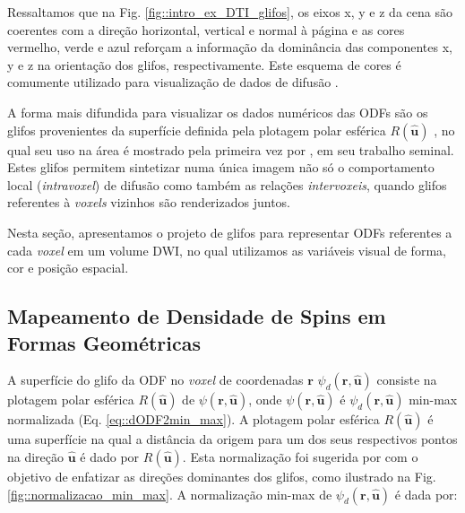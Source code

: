 \documentclass[
    12pt,                %
    oneside,            %
    a4paper,            %
    english,            %
    french,                %
    spanish,            %
    brazil                %
    ]{abntex2}
\begin{document}
Ressaltamos que na Fig. \ref{fig::intro_ex_DTI_glifos}, os eixos x, y e z da cena são coerentes com a direção horizontal, vertical e normal à página e as cores vermelho, verde e azul reforçam a informação da dominância das componentes x, y e z na orientação dos glifos, respectivamente. Este esquema de cores é comumente utilizado para visualização de dados de difusão \cite{DTI_Handbook}.


A forma mais difundida para visualizar os dados numéricos das ODFs são os glifos provenientes da superfície definida pela plotagem polar esférica $R(\mathbf{\hat{u}})$ \cite{descoteaux2015, daducci2014, TuchQBall2004}, no qual seu uso na área é mostrado pela primeira vez por , em seu trabalho seminal. Estes glifos permitem sintetizar numa única imagem não só o comportamento local (\textit{intravoxel}) de difusão como também as relações \textit{intervoxeis}, quando glifos referentes à \textit{voxels} vizinhos são renderizados juntos.


Nesta seção, apresentamos o projeto de glifos para representar ODFs referentes a cada \textit{voxel} em um volume DWI, no qual utilizamos as variáveis visual de forma, cor e posição espacial.

\subsection{Mapeamento de Densidade de Spins em Formas Geométricas}
\label{sec::glifos_odf}


A superfície do glifo da ODF no \textit{voxel} de coordenadas $\mathbf{r}$ $\psi_d(\mathbf{r}, \mathbf{\hat{u}})$ consiste na plotagem polar esférica $R(\mathbf{\hat{u}})$ de $\psi(\mathbf{r}, \mathbf{\hat{u}})$, onde $\psi(\mathbf{r}, \mathbf{\hat{u}})$ é $\psi_d(\mathbf{r}, \mathbf{\hat{u}})$ min-max normalizada  (Eq. \ref{eq::dODF2min_max}). A plotagem polar esférica $R(\mathbf{\hat{u}})$ é uma superfície na qual a distância da origem para um dos seus respectivos pontos na direção $\mathbf{\hat{u}}$ é dado por $R(\mathbf{\hat{u}})$. Esta normalização foi sugerida por  com o objetivo de enfatizar as direções dominantes dos glifos, como ilustrado na Fig. \ref{fig::normalizacao_min_max}. A normalização min-max de $\psi_d(\mathbf{r}, \mathbf{\hat{u}})$ é dada por:
\end{document}
